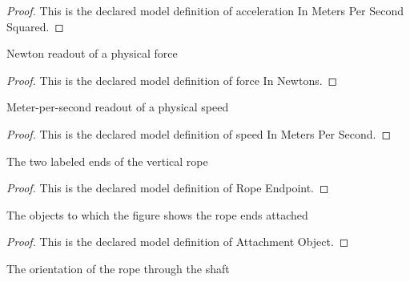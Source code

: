 \begin{proof}
  This is the declared model definition of acceleration In Meters Per Second Squared.
\end{proof}
\begin{definition}
  \label{def:physics:phyx-mini-0188:phyxminiproblems-problemphyxmini0188-forceinnewtons}
  Newton readout of a physical force
\end{definition}
\begin{proof}
  This is the declared model definition of force In Newtons.
\end{proof}
\begin{definition}
  \label{def:physics:phyx-mini-0188:phyxminiproblems-problemphyxmini0188-speedinmeterspersecond}
  Meter-per-second readout of a physical speed
\end{definition}
\begin{proof}
  This is the declared model definition of speed In Meters Per Second.
\end{proof}
\begin{definition}
  \label{def:physics:phyx-mini-0188:phyxminiproblems-problemphyxmini0188-ropeendpoint}
  The two labeled ends of the vertical rope
\end{definition}
\begin{proof}
  This is the declared model definition of Rope Endpoint.
\end{proof}
\begin{definition}
  \label{def:physics:phyx-mini-0188:phyxminiproblems-problemphyxmini0188-attachmentobject}
  The objects to which the figure shows the rope ends attached
\end{definition}
\begin{proof}
  This is the declared model definition of Attachment Object.
\end{proof}
\begin{definition}
  \label{def:physics:phyx-mini-0188:phyxminiproblems-problemphyxmini0188-ropeorientation}
  The orientation of the rope through the shaft
\end{definition}
